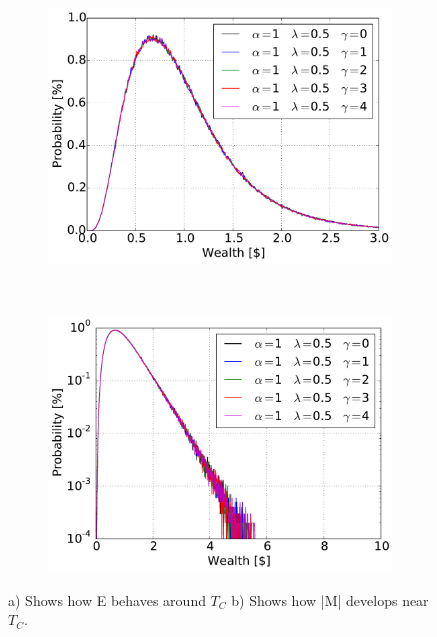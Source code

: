 \begin{figure}[H]
    \centering
    \begin{subfigure}{0.5\textwidth}
        \centering
        \includegraphics[width=\linewidth]{result/bilder/5e-1-50}
        \caption{}
    \end{subfigure}%
    ~ 
    \begin{subfigure}{0.5\textwidth}
        \centering
        \includegraphics[width=\linewidth]{result/bilder/5e-1-50-log}
        \caption{}
    \end{subfigure}
    \caption{a) Shows how E behaves around $T_C$ b) Shows how |M| develops near $T_C$.}
    \label{fig:5e-1-50}
\end{figure}



